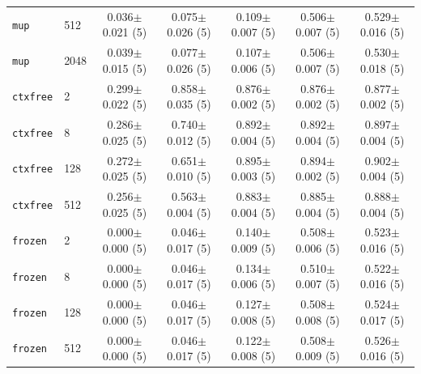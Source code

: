 \begin{table}[htbp]
\begin{tabular}{llccccc}
\texttt{mup} & 512 & 0.036$\pm$0.021 (5) & 0.075$\pm$0.026 (5) & 0.109$\pm$0.007 (5) & 0.506$\pm$0.007 (5) & 0.529$\pm$0.016 (5) \\
\texttt{mup} & 2048 & 0.039$\pm$0.015 (5) & 0.077$\pm$0.026 (5) & 0.107$\pm$0.006 (5) & 0.506$\pm$0.007 (5) & 0.530$\pm$0.018 (5) \\
\midrule
\texttt{ctxfree} & 2 & 0.299$\pm$0.022 (5) & 0.858$\pm$0.035 (5) & 0.876$\pm$0.002 (5) & 0.876$\pm$0.002 (5) & 0.877$\pm$0.002 (5) \\
\texttt{ctxfree} & 8 & 0.286$\pm$0.025 (5) & 0.740$\pm$0.012 (5) & 0.892$\pm$0.004 (5) & 0.892$\pm$0.004 (5) & 0.897$\pm$0.004 (5) \\
\texttt{ctxfree} & 128 & 0.272$\pm$0.025 (5) & 0.651$\pm$0.010 (5) & 0.895$\pm$0.003 (5) & 0.894$\pm$0.002 (5) & 0.902$\pm$0.004 (5) \\
\texttt{ctxfree} & 512 & 0.256$\pm$0.025 (5) & 0.563$\pm$0.004 (5) & 0.883$\pm$0.004 (5) & 0.885$\pm$0.004 (5) & 0.888$\pm$0.004 (5) \\
\midrule
\texttt{frozen} & 2 & 0.000$\pm$0.000 (5) & 0.046$\pm$0.017 (5) & 0.140$\pm$0.009 (5) & 0.508$\pm$0.006 (5) & 0.523$\pm$0.016 (5) \\
\texttt{frozen} & 8 & 0.000$\pm$0.000 (5) & 0.046$\pm$0.017 (5) & 0.134$\pm$0.006 (5) & 0.510$\pm$0.007 (5) & 0.522$\pm$0.016 (5) \\
\texttt{frozen} & 128 & 0.000$\pm$0.000 (5) & 0.046$\pm$0.017 (5) & 0.127$\pm$0.008 (5) & 0.508$\pm$0.008 (5) & 0.524$\pm$0.017 (5) \\
\texttt{frozen} & 512 & 0.000$\pm$0.000 (5) & 0.046$\pm$0.017 (5) & 0.122$\pm$0.008 (5) & 0.508$\pm$0.009 (5) & 0.526$\pm$0.016 (5) \\
\bottomrule
\end{tabular}\end{table}
